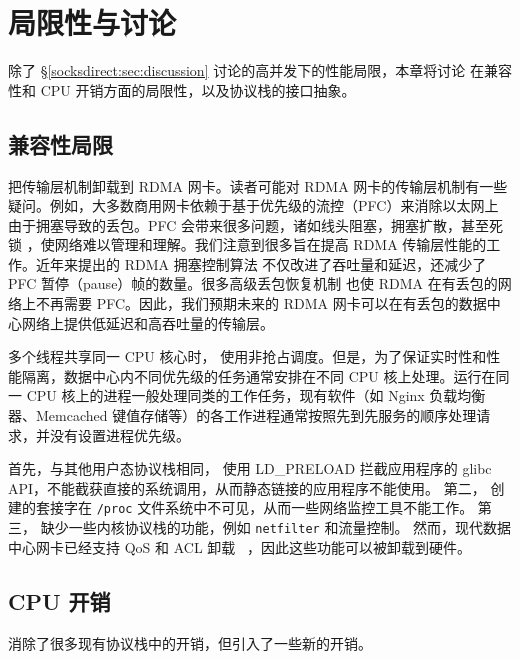 \section{局限性与讨论}
\label{sockdirect:sec:limitation}

除了 \S\ref{socksdirect:sec:discussion} 讨论的高并发下的性能局限，本章将讨论 \sys{} 在兼容性和 CPU 开销方面的局限性，以及协议栈的接口抽象。

\subsection{兼容性局限}



\sys{} 把传输层机制卸载到 RDMA 网卡。读者可能对 RDMA 网卡的传输层机制有一些疑问。例如，大多数商用网卡依赖于基于优先级的流控（PFC）来消除以太网上由于拥塞导致的丢包。PFC 会带来很多问题，诸如线头阻塞，拥塞扩散，甚至死锁 \cite{guo2016rdma}，使网络难以管理和理解。我们注意到很多旨在提高 RDMA 传输层性能的工作。近年来提出的 RDMA 拥塞控制算法 \cite{zhu2015congestion,mprdma,mittal2015timely,hpcc} 不仅改进了吞吐量和延迟，还减少了 PFC 暂停（pause）帧的数量。很多高级丢包恢复机制 \cite{mittal2018revisiting,lu2017memory} 也使 RDMA 在有丢包的网络上不再需要 PFC。因此，我们预期未来的 RDMA 网卡可以在有丢包的数据中心网络上提供低延迟和高吞吐量的传输层。

多个线程共享同一 CPU 核心时，\sys{} 使用非抢占调度。但是，为了保证实时性和性能隔离，数据中心内不同优先级的任务通常安排在不同 CPU 核上处理。运行在同一 CPU 核上的进程一般处理同类的工作任务，现有软件（如 Nginx 负载均衡器、Memcached 键值存储等）的各工作进程通常按照先到先服务的顺序处理请求，并没有设置进程优先级。

首先，与其他用户态协议栈相同，\libipc{} 使用 LD\_PRELOAD 拦截应用程序的 glibc API，不能截获直接的系统调用，从而静态链接的应用程序不能使用。
第二，\sys{} 创建的套接字在 \texttt{/proc} 文件系统中不可见，从而一些网络监控工具不能工作。
第三，\sys{} 缺少一些内核协议栈的功能，例如 \texttt{netfilter} 和流量控制。
然而，现代数据中心网卡已经支持 QoS 和 ACL 卸载 ~\cite{mellanox}，因此这些功能可以被卸载到硬件。

\subsection{CPU 开销}

\sys{} 消除了很多现有协议栈中的开销，但引入了一些新的开销。

